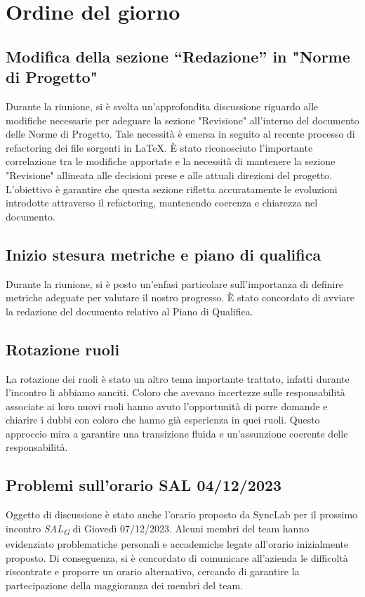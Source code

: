 \documentclass{article}
\begin{document}
\section{Ordine del giorno}
    \subsection{Modifica della sezione “Redazione” in "Norme di Progetto"}
    Durante la riunione, si è svolta un'approfondita discussione riguardo alle modifiche necessarie per adeguare la sezione "Revisione" all'interno del documento delle Norme di Progetto. Tale necessità è emersa in seguito al recente processo di refactoring dei file sorgenti in \LaTeX. È stato riconosciuto l'importante correlazione tra le modifiche apportate e la necessità di mantenere la sezione "Revisione" allineata alle decisioni prese e alle attuali direzioni del progetto. L'obiettivo è garantire che questa sezione rifletta accuratamente le evoluzioni introdotte attraverso il refactoring, mantenendo coerenza e chiarezza nel documento. 
    
    \subsection{Inizio stesura metriche e piano di qualifica}
    Durante la riunione, si è posto un'enfasi particolare sull'importanza di definire metriche adeguate per valutare il nostro progresso. È stato concordato di avviare la redazione del documento relativo al Piano di Qualifica. 

    \subsection{Rotazione ruoli}
    La rotazione dei ruoli è stato un altro tema importante trattato, infatti durante l'incontro li abbiamo sanciti. Coloro che avevano incertezze sulle responsabilità associate ai loro nuovi ruoli hanno avuto l'opportunità di porre domande e chiarire i dubbi con coloro che hanno già esperienza in quei ruoli. Questo approccio mira a garantire una transizione fluida e un'assunzione coerente delle responsabilità. 
    
    \subsection{Problemi sull'orario SAL 04/12/2023}
     Oggetto di discussione è stato anche l'orario proposto da SyncLab per il prossimo incontro \textit{SAL}\textsubscript{\textit{G}} di Giovedì 07/12/2023. Alcuni membri del team hanno evidenziato problematiche personali e accademiche legate all'orario inizialmente proposto. Di conseguenza, si è concordato di comunicare all'azienda le difficoltà riscontrate e proporre un orario alternativo, cercando di garantire la partecipazione della maggioranza dei membri del team. 
\end{document}
